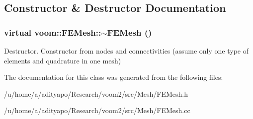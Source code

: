 \subsection{Constructor \& Destructor Documentation}
\hypertarget{classvoom_1_1_f_e_mesh_aca0b20d3ed91ee94eb8cd479de75ca05}{
\subsubsection[{$\sim$FEMesh}]{\setlength{\rightskip}{0pt plus 5cm}virtual voom::FEMesh::$\sim$FEMesh ()}}
\label{classvoom_1_1_f_e_mesh_aca0b20d3ed91ee94eb8cd479de75ca05}


Destructor. Constructor from nodes and connectivities (assume only one type of elements and quadrature in one mesh) 

The documentation for this class was generated from the following files:\begin{DoxyCompactItemize}
\item 
/u/home/a/adityapo/Research/voom2/src/Mesh/FEMesh.h\item 
/u/home/a/adityapo/Research/voom2/src/Mesh/FEMesh.cc\end{DoxyCompactItemize}
